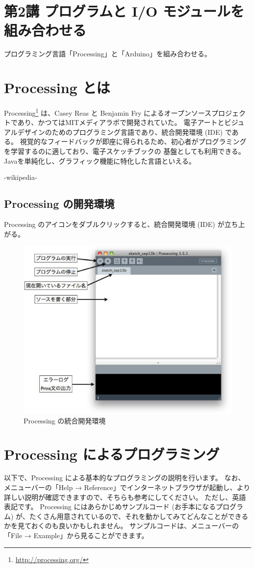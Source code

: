 \documentclass[11pt,a4paper]{jarticle}
\begin{document}
\section*{\LARGE{第2講 プログラムと I/O モジュールを組み合わせる}}
プログラミング言語「Processing」と「Arduino」を組み合わせる。



\section{Processing とは}
Processing\footnote{\url{http://processing.org/}} は、Casey Reas と Benjamin Fry によるオープンソースプロジェクトであり、かつてはMITメディアラボで開発されていた。
電子アートとビジュアルデザインのためのプログラミング言語であり、統合開発環境 (IDE) である。 視覚的なフィードバックが即座に得られるため、初心者がプログラミングを学習するのに適しており、電子スケッチブックの
基盤としても利用できる。
Javaを単純化し、グラフィック機能に特化した言語といえる。

\begin{flushright}
 -wikipedia-
\end{flushright}

\subsection*{Processing の開発環境}
Processing のアイコンをダブルクリックすると、統合開発環境 (IDE) が立ち上がる。

\begin{figure}[h]
 \centering
 \includegraphics[width=0.5\columnwidth]{img/processing_ide.eps}
 \caption{Processing の統合開発環境}
\end{figure}


\section{Processing によるプログラミング}
以下で、Processing による基本的なプログラミングの説明を行います。
なお、メニューバーの「Help → Reference」でインターネットブラウザが起動し、より詳しい説明が確認できますので、そちらも参考にしてください。
ただし、英語表記です。
Processing にはあらかじめサンプルコード (お手本になるプログラム) が、たくさん用意されているので、それを動かしてみてどんなことができるかを見ておくのも良いかもしれません。
サンプルコードは、メニューバーの「File → Example」から見ることができます。
\end{document}

